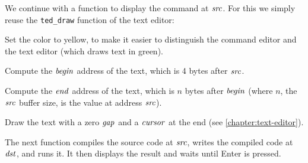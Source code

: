 We continue with a function to display the command at $\it{src}$. For this we
simply reuse the {\tt ted\_draw} function of the text editor:

\begin{Paragraph}
\begin{paracol}{2}

Set the color to yellow, to make it easier to distinguish the command editor
and the text editor (which draws text in green).


Compute the $\it{begin}$ address of the text, which is 4 bytes after $\it{src}$.


Compute the $\it{end}$ address of the text, which is $n$ bytes after
$\it{begin}$ (where $n$, the $\it{src}$ buffer size, is the value at address
$\it{src}$).


Draw the text with a zero $\it{gap}$ and a $\it{cursor}$ at the end (see
\cref{chapter:text-editor}).

\end{paracol}
\end{Paragraph}

The next function compiles the source code at $\it{src}$, writes the compiled
code at $\it{dst}$, and runs it. It then displays the result and waits until
Enter is pressed.

